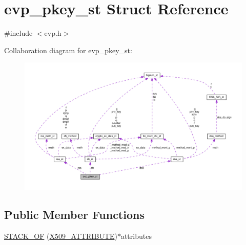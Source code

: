 \hypertarget{structevp__pkey__st}{}\section{evp\+\_\+pkey\+\_\+st Struct Reference}
\label{structevp__pkey__st}


{\ttfamily \#include $<$evp.\+h$>$}



Collaboration diagram for evp\+\_\+pkey\+\_\+st\+:
\nopagebreak
\begin{figure}[H]
\begin{center}
\leavevmode
\includegraphics[width=350pt]{structevp__pkey__st__coll__graph}
\end{center}
\end{figure}
\subsection*{Public Member Functions}
\begin{DoxyCompactItemize}
\item 
\hyperlink{structevp__pkey__st_a006f75f9d7bfba061b51a50727e45086}{S\+T\+A\+C\+K\+\_\+\+OF} (\hyperlink{x509_8h_aa4f1a62a9d2dd8cb6780fe2713737c0f}{X509\+\_\+\+A\+T\+T\+R\+I\+B\+U\+TE})$\ast$attributes
\end{DoxyCompactItemize}
